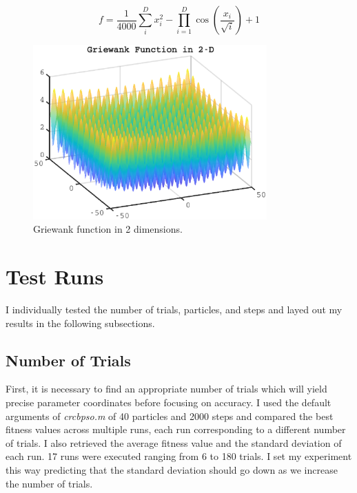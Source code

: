 \documentclass{article}
\begin{document}
\begin{equation}
f = \frac{1}{4000}\sum_{i}^{D}x_{i}^{2}-\prod_{i=1}^{D}\cos(\frac{x_{i}}{\sqrt{i}})+1
\label{eq:griewank}
\end{equation}

\begin{figure}[h!]
\centering
\includegraphics[width=0.8\textwidth]{griewank_3d}
\caption{Griewank function in 2 dimensions.}
\label{fig:griewank}
\end{figure}

\section{Test Runs}

I individually tested the number of trials, particles, and steps and layed out my results in the following subsections.

\subsection{Number of Trials}

First, it is necessary to find an appropriate number of trials which will yield precise parameter coordinates before focusing on accuracy.
I used the default arguments of \textit{crcbpso.m} of 40 particles and 2000 steps and compared the best fitness values across multiple runs, each run corresponding to a different number of trials. 
I also retrieved the average fitness value and the standard deviation of each run.
17 runs were executed ranging from 6 to 180 trials.
I set my experiment this way predicting that the standard deviation should go down as we increase the number of trials.
\end{document}
